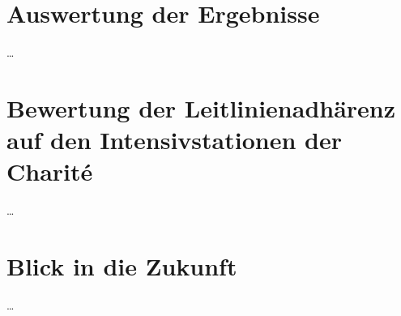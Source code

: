\section{Auswertung der Ergebnisse}
\dots

\section{Bewertung der Leitlinienadhärenz auf den Intensivstationen der Charité}
\dots

\section{Blick in die Zukunft}
\dots


